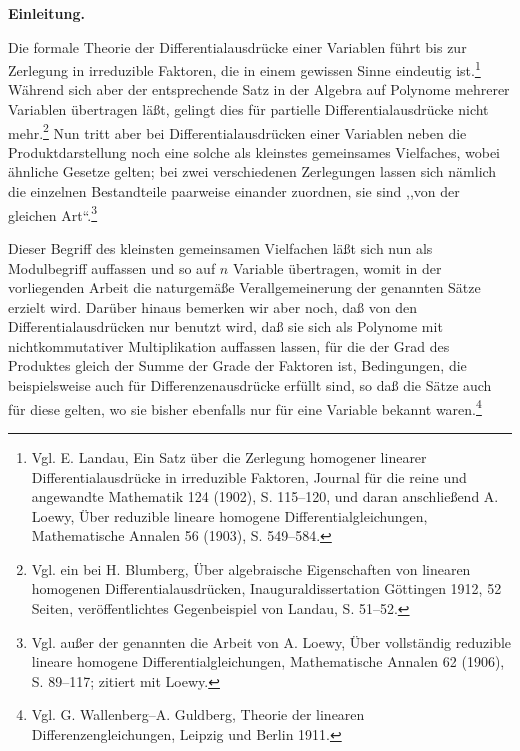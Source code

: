 \documentclass[11pt]{article}
\begin{document}
\begin{center}\textbf{Einleitung.}\end{center}

Die formale Theorie der Differentialausdrücke einer Variablen führt bis zur Zerlegung in irreduzible Faktoren, die in einem gewissen Sinne eindeutig ist.\footnote{Vgl. E. Landau, Ein Satz über die Zerlegung homogener linearer Differentialausdrücke in irreduzible Faktoren, Journal für die reine und angewandte Mathematik 124 (1902), S. 115--120, und daran anschließend A. Loewy, Über reduzible lineare homogene Differentialgleichungen, Mathematische Annalen 56 (1903), S. 549--584.} Während sich aber der entsprechende Satz in der Algebra auf Polynome mehrerer Variablen übertragen läßt, gelingt dies für partielle Differentialausdrücke nicht mehr.\footnote{Vgl. ein bei H. Blumberg, Über algebraische Eigenschaften von linearen homogenen Differentialausdrücken, Inauguraldissertation Göttingen 1912, 52 Seiten, veröffentlichtes Gegenbeispiel von Landau, S. 51--52.} Nun tritt aber bei Differentialausdrücken einer Variablen neben die Produktdarstellung noch eine solche als kleinstes gemeinsames Vielfaches, wobei ähnliche Gesetze gelten; bei zwei verschiedenen Zerlegungen lassen sich nämlich die einzelnen Bestandteile paarweise einander zuordnen, sie sind ,,von der gleichen Art``.\footnote{Vgl. außer der genannten die Arbeit von A. Loewy, Über vollständig reduzible lineare homogene Differentialgleichungen, Mathematische Annalen 62 (1906), S. 89--117; zitiert mit Loewy.}

Dieser Begriff des kleinsten gemeinsamen Vielfachen läßt sich nun als Modulbegriff auffassen und so auf $n$ Variable übertragen, womit in der vorliegenden Arbeit die naturgemäße Verallgemeinerung der genannten Sätze erzielt wird. Darüber hinaus bemerken wir aber noch, daß von den Differentialausdrücken nur benutzt wird, daß sie sich als Polynome mit nichtkommutativer Multiplikation auffassen lassen, für die der Grad des Produktes gleich der Summe der Grade der Faktoren ist, Bedingungen, die beispielsweise auch für Differenzenausdrücke erfüllt sind, so daß die Sätze auch für diese gelten, wo sie bisher ebenfalls nur für eine Variable bekannt waren.\footnote{Vgl. G. Wallenberg--A. Guldberg, Theorie der linearen Differenzengleichungen, Leipzig und Berlin 1911.}
\end{document}
